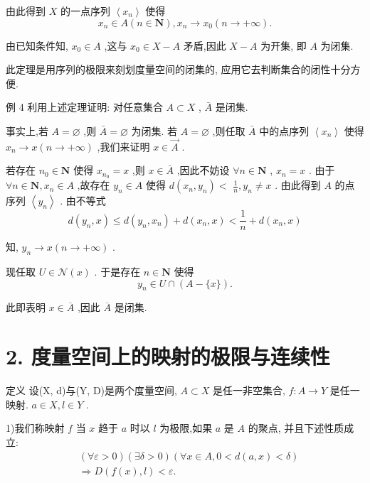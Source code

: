 由此得到 $X$ 的一点序列 $\left\langle  {x}_{n}\right\rangle$ 使得
$${x}_{n} \in  A\left( {n \in  \mathbf{N}}\right) ,{x}_{n} \rightarrow  {x}_{0}\left( {n \rightarrow   + \infty }\right) .$$

由已知条件知, ${x}_{0} \in  A$ ,这与 ${x}_{0} \in  X - A$ 矛盾,因此 $X - A$ 为开集, 即 $A$ 为闭集.

此定理是用序列的极限来刻划度量空间的闭集的, 应用它去判断集合的闭性十分方便.

例 4 利用上述定理证明: 对任意集合 $A \subset  X$ , $\bar{A}$ 是闭集.

事实上,若 $A = \varnothing$ ,则 $\bar{A} = \varnothing$ 为闭集. 若 $A = \varnothing$ ,则任取 $\bar{A}$ 中的点序列 $\left\langle  {x}_{n}\right\rangle$ 使得 ${x}_{n} \rightarrow  x\left( {n \rightarrow   + \infty }\right)$ ,我们来证明 $x \in  \overrightarrow{A}$ .

若存在 ${n}_{0} \in  \mathbf{N}$ 使得 ${x}_{{n}_{0}} = x$ ,则 $x \in  \bar{A}$ ,因此不妨设 $\forall n \in  \mathbf{N}$ , ${x}_{n} = x$ . 由于 $\forall n \in  \mathbf{N},{x}_{n} \in  A$ ,故存在 ${y}_{n} \in  A$ 使得 $d\left( {{x}_{n},{y}_{n}}\right)  <$  $\frac{1}{n},{y}_{n} \neq  x$ . 由此得到 $A$ 的点序列 $\left\langle  {y}_{n}\right\rangle$ . 由不等式
$$d\left( {{y}_{n},x}\right)  \leq  d\left( {{y}_{n},{x}_{n}}\right)  + d\left( {{x}_{n},x}\right)  < \frac{1}{n} + d\left( {{x}_{n},x}\right)$$

知, ${y}_{n} \rightarrow  x\left( {n \rightarrow   + \infty }\right)$ .

现任取 $U \in  \mathcal{N}\left( x\right)$ . 于是存在 $n \in  \mathbf{N}$ 使得
$${y}_{n} \in  U \cap  \left( {A-\{ x\} }\right) .$$

此即表明 $x \in  \overline{A}$ ,因此 $\overline{A}$ 是闭集.

\section*{2. 度量空间上的映射的极限与连续性}

定义 设(X, d)与(Y, D)是两个度量空间, $A \subset  X$ 是任一非空集合, $f : A \rightarrow  Y$ 是任一映射. $a \in  X,l \in  Y$ .

1)我们称映射 $f$ 当 $x$ 趋于 $a$ 时以 $l$ 为极限,如果 $a$ 是 $A$ 的聚点, 并且下述性质成立:
\begin{align*}
	&\left( {\forall \varepsilon  > 0}\right) \left( {\exists \delta  > 0}\right) \left( {\forall x \in  A,0 < d\left( {a,x}\right)  < \delta }\right)\\
	&\Rightarrow  D\left( {f\left( x\right) ,l}\right)  < \varepsilon .
\end{align*}


